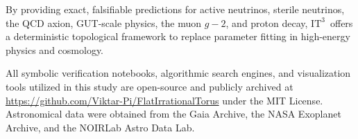 \documentclass[onecolumn,aps,prd,superscriptaddress,nofootinbib,amsmath,amssymb]{revtex4-2}
\theoremstyle{definition}
\theoremstyle{remark}
\newcommand{\ITthree}{\ensuremath{\mathrm{IT}^3}}
\begin{document}
By providing exact, falsifiable predictions for active neutrinos, sterile neutrinos, the QCD axion, GUT-scale physics, the muon $g-2$, and proton decay, \ITthree\ offers a deterministic topological framework to replace parameter fitting in high-energy physics and cosmology.

\begin{acknowledgments}
All symbolic verification notebooks, algorithmic search engines, and visualization tools utilized in this study are open-source and publicly archived at \url{https://github.com/Viktar-Pi/FlatIrrationalTorus} under the MIT License. Astronomical data were obtained from the Gaia Archive, the NASA Exoplanet Archive, and the NOIRLab Astro Data Lab.
\end{acknowledgments}
\end{document}
